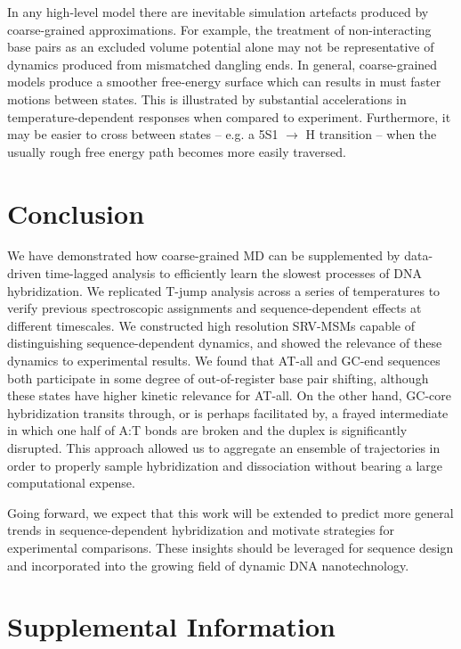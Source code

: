 \documentclass[journal=jpcbfk,manuscript=article]{achemso}
\begin{document}
In any high-level model there are inevitable simulation artefacts produced by coarse-grained approximations. For example, the treatment of non-interacting base pairs as an excluded volume potential alone may not be representative of dynamics produced from mismatched dangling ends. In general, coarse-grained models produce a smoother free-energy surface which can results in must faster motions between states. This is illustrated by substantial accelerations in temperature-dependent responses when compared to experiment. Furthermore, it may be easier to cross between states -- e.g. a 5S1 $\rightarrow$ H transition -- when the usually rough free energy path becomes more easily traversed. 

\section{\label{sec:conc}Conclusion}

We have demonstrated how coarse-grained MD can be supplemented by data-driven time-lagged analysis to efficiently learn the slowest processes of DNA hybridization. We replicated T-jump analysis across a series of temperatures to verify previous spectroscopic assignments and sequence-dependent effects at different timescales. We constructed high resolution SRV-MSMs capable of distinguishing sequence-dependent dynamics, and showed the relevance of these dynamics to experimental results. We found that AT-all and GC-end sequences both participate in some degree of out-of-register base pair shifting, although these states have higher kinetic relevance for AT-all. On the other hand, GC-core hybridization transits through, or is perhaps facilitated by, a frayed intermediate in which one half of A:T bonds are broken and the duplex is significantly disrupted. This approach allowed us to aggregate an ensemble of trajectories in order to properly sample hybridization and dissociation without bearing a large computational expense.

Going forward, we expect that this work will be extended to predict more general trends in sequence-dependent hybridization and motivate strategies for experimental comparisons. These insights should be leveraged for sequence design and incorporated into the growing field of dynamic DNA nanotechnology. 

\newcommand{\sectionbreak}{\clearpage}
\section{\label{sec:Results}Supplemental Information}
\end{document}
